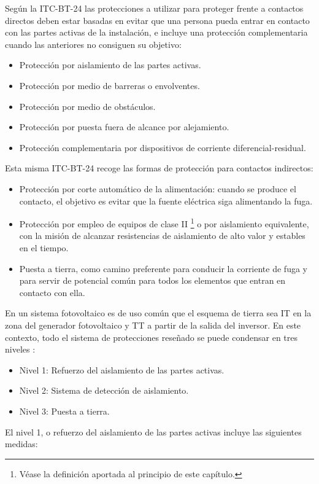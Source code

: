 Según la ITC-BT-24 las protecciones a utilizar para proteger frente
a contactos directos deben estar basadas en evitar que una persona
pueda entrar en contacto con las partes activas de la instalación,
e incluye una protección complementaria cuando las anteriores no consiguen
su objetivo:
\begin{itemize}
\item Protección por aislamiento de las partes activas.
\item Protección por medio de barreras o envolventes.
\item Protección por medio de obstáculos.
\item Protección por puesta fuera de alcance por alejamiento.
\item Protección complementaria por dispositivos de corriente diferencial-residual.
\end{itemize}
Esta misma ITC-BT-24 recoge las formas de protección para contactos
indirectos:
\begin{itemize}
\item Protección por corte automático de la alimentación: cuando se produce
el contacto, el objetivo es evitar que la fuente eléctrica siga alimentando
la fuga.
\item Protección por empleo de equipos de clase II%
\footnote{Véase la definición aportada al principio de este capítulo.%
} o por aislamiento equivalente, con la misión de alcanzar resistencias
de aislamiento de alto valor y estables en el tiempo.
\item Puesta a tierra, como camino preferente para conducir la corriente
de fuga y para servir de potencial común para todos los elementos
que entran en contacto con ella.
\end{itemize}
En un sistema fotovoltaico es de uso común que el esquema de tierra
sea IT en la zona del generador fotovoltaico y TT a partir de la salida
del inversor. En este contexto, todo el sistema de protecciones reseñado
se puede condensar en tres niveles \citep{Gomez-Vidal2000}:
\begin{itemize}
\item Nivel 1: Refuerzo del aislamiento de las partes activas. 
\item Nivel 2: Sistema de detección de aislamiento.
\item Nivel 3: Puesta a tierra.
\end{itemize}
El nivel 1, o refuerzo del aislamiento de las partes activas incluye
las siguientes medidas:
